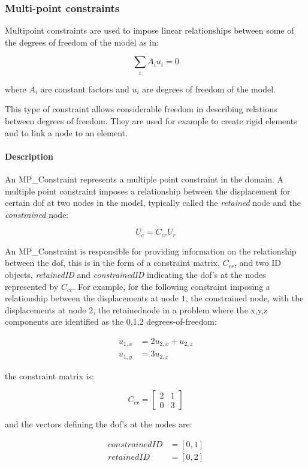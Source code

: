 \subsubsection{Multi-point constraints}\label{sc_mp_constraints}

Multipoint constraints are used to impose linear relationships between some of the degrees of freedom of the model as in:

\begin{equation}
  \sum_{i} A_i u_i= 0
\end{equation}

\noindent where $A_i$ are constant factors and $u_i$ are degrees of freedom of the model.

This type of constraint allows considerable freedom in describing relations between degrees of freedom. They are used for example to create rigid elements and to link a node to an element.

\paragraph{Description}
An MP\_Constraint represents a multiple point constraint in the domain. A multiple point constraint imposes a relationship between the displacement for certain dof at two nodes in the model, typically called the {\em retained} node and the {\em constrained} node:

\begin{equation}
U_c = C_{cr} U_r
\end{equation}


An MP\_Constraint is responsible for providing information on the relationship between the dof, this is in the form of a constraint matrix, $C_{cr}$, and two ID objects, {\em retainedID} and {\em constrainedID} indicating the dof's at the nodes represented by $C_{cr}$. For example, for the following constraint imposing a relationship between the displacements at node $1$, the constrained node, with the displacements at node $2$, the retainednode in a problem where the x,y,z components are identified as the 0,1,2 degrees-of-freedom:

\begin{align}
u_{1,x} &= 2 u_{2,x} + u_{2,z} \\
u_{1,y} &= 3 u_{2,z}
\end{align}

\noindent the constraint matrix is:

\begin{equation}
C_{cr} =
\left[
\begin{array}{cc}
2 & 1  \\
0 & 3
\end{array}
\right] 
\end{equation}

\noindent and the vectors defining the dof's at the nodes are:

\begin{align}
constrainedID &= [0, 1] \\
retainedID &= [0, 2]
\end{align}

